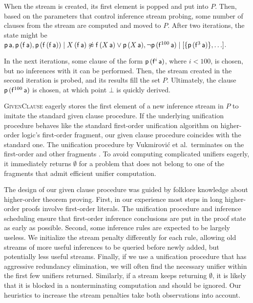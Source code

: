 \documentclass[smallcondensed,draft]{svjour3}     %
\begin{document}
\begin{examplex}
  When the stream is created, its first element is popped and put into $P$. Then, based on the
  parameters that control inference stream probing, some number of clauses from
  the stream are computed and moved to $P$. After two iterations, the state might be
  $ \mathsf{p} \,
  \mathsf{a}, \mathsf{p} \, (\mathsf{f} \, \mathsf{a}), \mathsf{p} \, (\mathsf{f} \, (\mathsf{f} \, \mathsf{a}))   \mid X \,
  (\mathsf{f} \, \mathsf{a}) \not\approx \mathsf{f} \, (X \, \mathsf{a}) \lor \mathsf{p} \, (X \,
  \mathsf{a}), \neg \mathsf{p} \, (\mathsf{f}^{100} \, \mathsf{a}) \mid [ \{\mathsf{p} \, (\mathsf{f}^3\,\mathsf{a})\}, \ldots ]$. 
  
  In the next iterations, some clause of the form $\mathsf{p} \, (\mathsf{f}^{i} \,
  \mathsf{a})$, where $i < 100$, is chosen, but no inferences with it can be
  performed. Then, the stream created in the second iteration is probed, and its
  results fill the set $P$. Ultimately, the clause $\mathsf{p} \, (\mathsf{f}^{100} \,
  \mathsf{a})$ is chosen, at which point $\bot$ is quickly derived.
\end{examplex}

\textsc{GivenClause} eagerly stores the first element of a new inference stream
in $P$ to imitate the standard given clause procedure. If the underlying
unification procedure behaves like the standard first-order unification
algorithm on higher-order logic's first-order fragment, our given clause
procedure coincides with the standard one. The unification procedure by
Vukmirović et al.\ terminates on the first-order and other fragments
\cite{tn-93-patterns}. To avoid computing
complicated unifiers eagerly, it immediately returns $\emptyset$ for a problem that does not
belong to one of the fragments that admit efficient unifier computation.


The design of our given clause procedure was guided by folklore knowledge about
higher-order theorem proving. First, in our experience most steps in
long higher-order proofs involve first-order literals. The unification
procedure and inference scheduling ensure that first-order inference
conclusions are put in the proof state as early as possible. Second, some
inference rules are expected to be largely useless. We initialize the stream
penalty differently for each rule, allowing old streams of more useful
inferences to be queried before newly added, but potentially less useful
streams. Finally, if we use a unification procedure that has aggressive
redundancy elimination, we will often find the necessary unifier within the
first few unifiers returned. Similarly, if a stream keeps returning
$\emptyset$, it is likely that it is blocked in a nonterminating computation
and should be ignored. Our heuristics to increase the stream penalties take
both observations into account.
\end{document}
